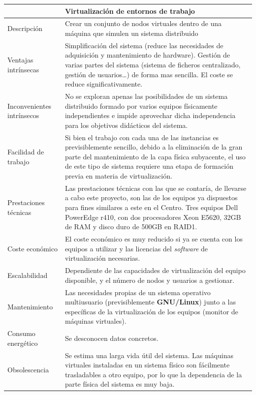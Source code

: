 \begin{table}[H]
\begin{tabular}{|p{2.4cm}|p{12cm}|}
\hline
&\textbf{Virtualización de entornos de trabajo}\\
\hline
Descripción&Crear un conjunto de nodos virtuales dentro de una máquina que simulen un sistema distribuido\\
\hline
Ventajas intrínsecas&Simplificación del sistema (reduce las necesidades de adquisición y mantenimiento de hardware). Gestión de varias partes del sistema (sistema de ficheros centralizado, gestión de usuarios\dots) de forma mas sencilla. El coste se reduce significativamente.\\
\hline
Inconvenientes intrínsecos&No se exploran apenas las posibilidades de un sistema distribuido formado por varios equipos físicamente independientes e impide aprovechar dicha independencia para los objetivos didácticos del sistema.\\
\hline
Facilidad de trabajo&Si bien el trabajo con cada una de las instancias es previsiblemente sencillo, debido a la eliminación de la gran parte del mantenimiento de la capa física subyacente, el uso de este tipo de sistema requiere una etapa de formación previa en materia de virtualización.\\
\hline
Prestaciones técnicas&Las prestaciones técnicas con las que se contaría, de llevarse a cabo este proyecto, son las de los equipos ya dispuestos para fines similares a este en el Centro. Tres equipos Dell PowerEdge r410, con dos procesadores Xeon E5620, 32GB de RAM y disco duro de 500GB en RAID1.\\
\hline
Coste económico&El coste económico es muy reducido si ya se cuenta con los equipos a utilizar y las licencias del \textit{software} de virtualización necesarias.\\
\hline
Escalabilidad&Dependiente de las capacidades de virtualización del equipo disponible, y el número de nodos y usuarios a gestionar.\\
\hline
Mantenimiento&Las necesidades propias de un sistema operativo multiusuario (previsiblemente \textbf{GNU/Linux}) junto a las específicas de la virtualización de los equipos (monitor de máquinas virtuales).\\
\hline
Consumo energético&Se desconocen datos concretos.\\
\hline
Obsolescencia&Se estima una larga vida útil del sistema. Las máquinas virtuales instaladas en un sistema físico son fácilmente trasladables a otro equipo, por lo que la dependencia de la parte física del sistema es muy baja.\\

\end{tabular}
\end{table}
